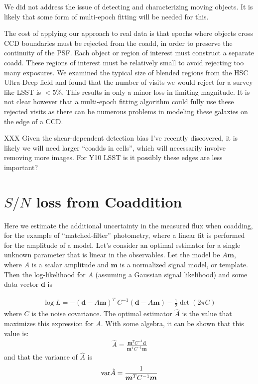 \documentclass[fleqn,useAMS,usenatbib]{mnras}
\begin{document}
We did not address the issue of detecting and characterizing moving objects.
It is likely that some form of multi-epoch fitting will be needed for this.

The cost of applying our approach to real data is that epochs where objects
cross CCD boundaries must be rejected from the coadd, in order to preserve the
continuity of the PSF.  Each object or region of interest must construct a
separate coadd.  These regions of interest must be relatively small to avoid
rejecting too many exposures.  We examined the typical size of blended regions
from the HSC Ultra-Deep field and found that the number of visits we would
reject for a survey like LSST is $< 5\%$.  This results in only a minor loss in
limiting magnitude.  It is not clear however that a multi-epoch fitting
algorithm could fully use these rejected visits as there can be numerous
problems in modeling these galaxies on the edge of a CCD.

XXX Given the shear-dependent detection bias I've recently discovered, it is
likely we will need larger ``coadds in cells'', which will necessarily involve
removing more images.  For Y10 LSST is it possibly these edges are less important?




\appendix
\section{$S/N$ loss from Coaddition} 
\label{Section:FluxSN}
Here we estimate the additional uncertainty in the measured flux when coadding,
for the example of ``matched-filter'' photometry, where a linear fit is 
performed
for the amplitude of a model.
Let's consider an optimal estimator for a single unknown parameter that is
linear in the observables. Let the model be $A\boldsymbol{m}$, where $A$ is a
scalar amplitude and $\boldsymbol{m}$ is a normalized signal model, or
template. Then the log-likelihood for $A$ (assuming a Gaussian signal
likelihood) and some data vector $\boldsymbol{d}$ is

\begin{align}
\log L = - (\boldsymbol{d} - A\boldsymbol{m})^T\: C^{-1} (\boldsymbol{d} - 
A\boldsymbol{m}) - \frac{1}{2} \det(2\pi C )
\end{align}
where $C$ is the noise covariance.  The optimal estimator $\hat{A}$ is the
value that maximizes this expression for $A$. With some algebra, it can be
shown that this value is:
\begin{align}
\hat{A} = \frac{\boldsymbol{m}^T C^{-1} \boldsymbol{d}}{\boldsymbol{m}^T C^{-1} 
\boldsymbol{m}}
\end{align}
and that the variance of $\hat{A}$ is
\begin{align}
{\rm var}\hat{A} = \frac{1}{{\boldsymbol{m}^T C^{-1} \boldsymbol{m}}}
\end{align}
\end{document}
